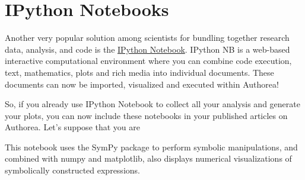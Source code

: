 \section{IPython Notebooks}
Another very popular solution among scientists for bundling together research data, analysis, and code is the \href{http://ipython.org/notebook.html}{IPython Notebook}. IPython NB is a web-based interactive computational environment where you can combine code execution, text, mathematics, plots and rich media into individual documents. These documents can now be imported, visualized and executed within Authorea!

So, if you already use IPython Notebook to collect all your analysis and generate your plots, you can now include these notebooks in your published articles on Authorea. Let's suppose that you are  

This notebook uses the SymPy package to perform symbolic manipulations, and combined with numpy and matplotlib, also displays numerical visualizations of symbolically constructed expressions.
